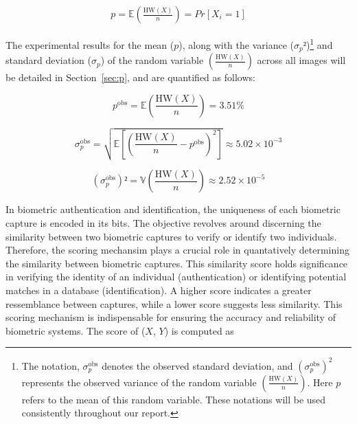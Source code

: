 \begin{equation} \label{eq:p}
    \begin{aligned}
        p = \mathbb{E}\left( \frac{\text{HW}(X)}{n} \right) = Pr\left[X_i = 1\right]
    \end{aligned}
\end{equation}

The experimental results for the mean (\(p\)), along with the variance (\(\sigma_{p}²\))\footnote{The notation, \( \sigma_{p}^{\text{obs}} \) denotes the observed standard deviation, and \( (\sigma_{p}^{\text{obs}})^2 \) represents the observed variance of the random variable \(\left( \frac{\text{HW}(X)}{n} \right)\). Here $p$ refers to the mean of this random variable. These notations will be used consistently throughout our report.} and standard deviation (\(\sigma_p\)) of the random variable \(\left( \frac{\text{HW}(X)}{n} \right)\) across all images will be detailed in Section~\ref{sec:p}, and are quantified as follows:

\begin{equation} \label{eq:proba1}
    p^{\text{obs}} = \mathbb{E}\left( \frac{\text{HW}(X)}{n} \right) = 3.51\%
\end{equation}


\begin{equation} \label{eq:proba2}
    \sigma_{p}^{\text{obs}} = \sqrt{\mathbb{E} \left[ \left( \frac{\text{HW}(X)}{n} - p^{\text{obs}} \right)^2 \right]} \approx 5.02 \times 10^{-3}
\end{equation}

\begin{equation} \label{eq:proba3}
    (\sigma_{p}^{\text{obs}})² = \mathbb{V}\left( \frac{\text{HW}(X)}{n} \right)  \approx 2.52 \times 10^{-5}
\end{equation}

In biometric authentication and identification, the uniqueness of each biometric capture is encoded in its bits. The objective revolves around discerning the similarity between two biometric captures to verify or identify two individuals. Therefore, the scoring mechansim plays a crucial role in quantatively determining the similarity between biometric captures. This similarity score holds significance in verifying the identity of an individual (authentication) or identifying potential matches in a database (identification). A higher score indicates a greater ressemblance between captures, while a lower score suggests less similarity. This scoring mechanism is indispensable for ensuring the accuracy and reliability of biometric systems. The score of (\(X\), \(Y\)) is computed as

